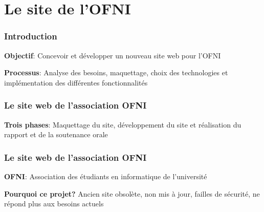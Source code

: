 \section{Le site de l'OFNI}

\begin{frame}
    \frametitle{Introduction}
    \centering
    \textbf{Objectif}: Concevoir et développer un nouveau site web pour l’OFNI
    \vspace{1cm}

    \textbf{Processus}: Analyse des besoins, maquettage, choix des technologies et implémentation des différentes fonctionnalités
\end{frame}

\begin{frame}
    \frametitle{Le site web de l’association OFNI}
    \centering
    \textbf{Trois phases}: Maquettage du site, développement du site et réalisation du rapport et de la soutenance orale
\end{frame}

\begin{frame}
    \frametitle{Le site web de l’association OFNI}
    \centering
    \textbf{OFNI}: Association des étudiants en informatique de l’université
    \vspace{1cm}

    \textbf{Pourquoi ce projet?} Ancien site obsolète, non mis à jour, failles de sécurité, ne répond plus aux besoins actuels
\end{frame}
